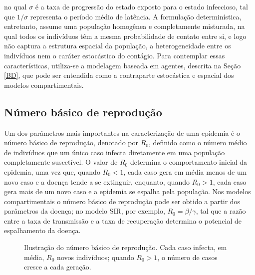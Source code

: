 \documentclass[
	12pt,				%
	openright,			%
	oneside,			%
	a4paper,			%
	english,			%
	french,				%
	spanish,			%
	brazil				%
	]{abntex2}
\begin{document}
no qual $\sigma$ é a taxa de progressão do estado exposto para o estado infeccioso, tal que $1/\sigma$ representa o período médio de latência. A formulação determinística, entretanto, assume uma população homogênea e completamente misturada, na qual todos os indivíduos têm a mesma probabilidade de contato entre si, e logo não captura a estrutura espacial da população, a heterogeneidade entre os indivíduos nem o caráter estocástico do contágio. Para contemplar essas características, utiliza-se a modelagem baseada em agentes, descrita na Seção \ref{BD}, que pode ser entendida como a contraparte estocástica e espacial dos modelos compartimentais.

\subsection{Número básico de reprodução}

Um dos parâmetros mais importantes na caracterização de uma epidemia é o número básico de reprodução, denotado por $R_0$, definido como o número médio de indivíduos que um único caso infecta diretamente em uma população completamente suscetível. O valor de $R_0$ determina o comportamento inicial da epidemia, uma vez que, quando $R_0 < 1$, cada caso gera em média menos de um novo caso e a doença tende a se extinguir, enquanto, quando $R_0 > 1$, cada caso gera mais de um novo caso e a epidemia se espalha pela população. Nos modelos compartimentais o número básico de reprodução pode ser obtido a partir dos parâmetros da doença; no modelo SIR, por exemplo, $R_0 = \beta / \gamma$, tal que a razão entre a taxa de transmissão e a taxa de recuperação determina o potencial de espalhamento da doença.

\begin{figure}[H]
\centering
{}
\caption{Ilustração do número básico de reprodução. Cada caso infecta, em média, $R_0$ novos indivíduos; quando $R_0 > 1$, o número de casos cresce a cada geração.}
\label{fig:r0}
\end{figure}
\end{document}
